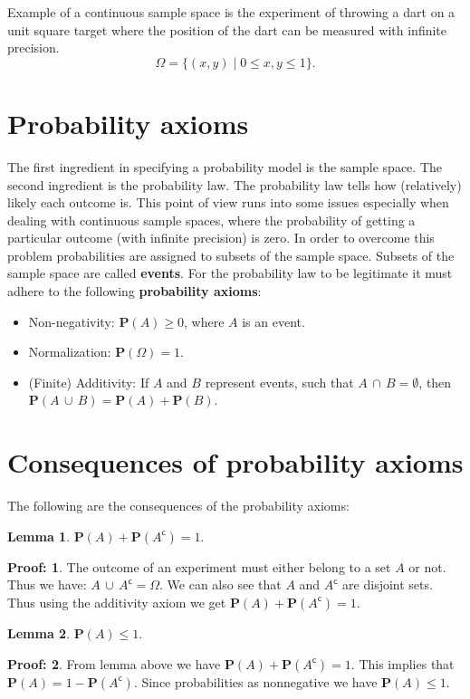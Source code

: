 \documentclass[11pt]{amsart}
\theoremstyle{definition} \newtheorem{thm}{Theorem:} \theoremstyle{plain}
\theoremstyle{definition} \newtheorem*{nnthm}{Theorem:} \theoremstyle{plain}
\theoremstyle{definition} \newtheorem{lem}{Lemma} \theoremstyle{plain}
\theoremstyle{definition} \newtheorem*{nnlem}{Lemma:} \theoremstyle{plain}
\theoremstyle{definition} \newtheorem{prf}{Proof:} \theoremstyle{plain}
\theoremstyle{definition} \newtheorem*{nnprf}{Proof:} \theoremstyle{plain}
\theoremstyle{definition} \newtheorem{eg}{Example:} \theoremstyle{plain}
\theoremstyle{definition} \newtheorem*{sol}{Solution:} \theoremstyle{plain}
\newcommand{\setcomp}[1]{{#1}^{\mathsf{c}}}
\newcommand{\prob}[1]{\mathbf{P}(#1)}
\newcommand{\twocup}[2]{{#1} \,\cup\, {#2}}
\newcommand{\twocap}[2]{{#1} \,\cap\, {#2}}
\begin{document}
Example of a continuous sample space is the experiment of throwing a dart on a 
unit square target where the position of the dart can be measured with infinite precision. 
\begin{equation*}
\Omega = \{ (x, y) \mid 0 \leq x, y \leq 1\}.
\end{equation*}

\section{Probability axioms}
The first ingredient in specifying a probability model is the sample space. The 
second ingredient is the probability law. The probability law tells how 
(relatively) likely each outcome is. This point of view runs into some issues 
especially when dealing with continuous sample spaces, where the probability 
of getting a particular outcome (with infinite precision) is zero. In order to 
overcome this problem probabilities are assigned to subsets of the sample space. 
Subsets of the sample space are called \textbf{events}. For the probability law 
to be legitimate it must adhere to the following \textbf{probability axioms}:
\begin{itemize}
\item Non-negativity: $\prob{A} \geq 0$, where $A$ is an event.
\item Normalization: $\prob{\Omega} = 1$.
\item (Finite) Additivity: If $A$ and $B$ represent events, such that 
$\twocap{A}{B} = \emptyset $, then 
$\prob{\twocup{A}{B}} = \prob{A} + \prob{B}$.
\end{itemize}
  

\section{Consequences of probability axioms}
The following are the consequences of the probability axioms:

\begin{lem}
$\prob{A} + \prob{\setcomp{A}} = 1$.
\end{lem}
\begin{nnprf}
The outcome of an experiment must either belong to a set $A$ or 
not. Thus we have: $\twocup{A}{\setcomp{A}} = \Omega$. We can also see that 
$A$ and $\setcomp{A}$ are disjoint sets. Thus using the additivity axiom we 
get $\prob{A} + \prob{\setcomp{A}} = 1$.
\end{nnprf}

\begin{lem}
$\prob{A} \leq  1$.
\end{lem}
\begin{nnprf}
From lemma above we have $\prob{A} + \prob{\setcomp{A}} = 1$. This implies that 
$\prob{A} = 1 - \prob{\setcomp{A}}$. Since probabilities as nonnegative we have 
$\prob{A} \leq 1$. 
\end{nnprf}
\end{document}
